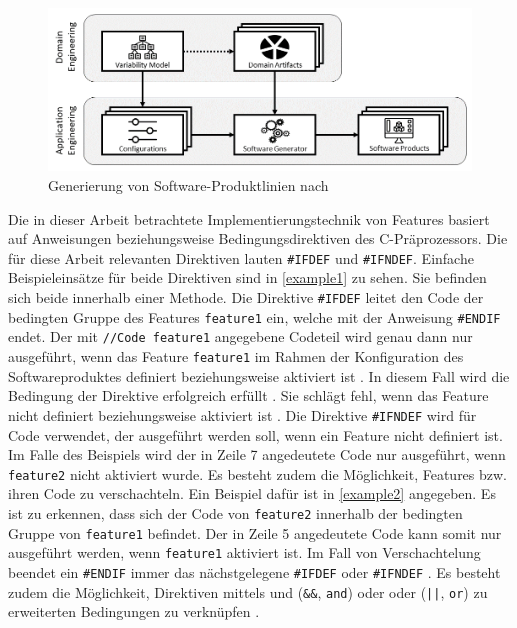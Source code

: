 \begin{figure}[]
    \centering
    \includegraphics[width=\textwidth]{images/SPL}
    \caption{Generierung von Software-Produktlinien nach \cite{Thuem2014}\label{fig:spl}}
\end{figure}

Die in dieser Arbeit betrachtete Implementierungstechnik von Features basiert auf Anweisungen beziehungsweise Bedingungsdirektiven des C-Präprozessors. Die für diese Arbeit relevanten Direktiven lauten \texttt{\#IFDEF} und \texttt{\#IFNDEF}. Einfache Beispieleinsätze für beide Direktiven sind in \autoref{example1} zu sehen. Sie befinden sich beide innerhalb einer Methode. Die Direktive \texttt{\#IFDEF} leitet den Code der bedingten Gruppe des Features \texttt{feature1} ein, welche mit der Anweisung \texttt{\#ENDIF} endet. Der mit \texttt{//Code feature1} angegebene Codeteil wird genau dann nur ausgeführt, wenn das Feature \texttt{feature1} im Rahmen der Konfiguration des Softwareproduktes definiert beziehungsweise aktiviert ist \cite{Stallmann2016}. In diesem Fall wird die Bedingung der Direktive erfolgreich erfüllt \cite{Stallmann2016}. Sie schlägt fehl, wenn das Feature nicht definiert beziehungsweise aktiviert ist \cite{Stallmann2016}. Die Direktive \texttt{\#IFNDEF} wird für Code verwendet, der ausgeführt werden soll, wenn ein Feature nicht definiert ist. Im Falle des Beispiels wird der in Zeile 7 angedeutete Code nur ausgeführt, wenn \texttt{feature2} nicht aktiviert wurde.
Es besteht zudem die Möglichkeit, Features bzw. ihren Code zu verschachteln. Ein Beispiel dafür ist in \autoref{example2} angegeben. Es ist zu erkennen, dass sich der Code von \texttt{feature2} innerhalb der bedingten Gruppe von \texttt{feature1} befindet. Der in Zeile 5 angedeutete Code kann somit nur ausgeführt werden, wenn \texttt{feature1} aktiviert ist. Im Fall von Verschachtelung beendet ein \texttt{\#ENDIF} immer das nächstgelegene \texttt{\#IFDEF} oder \texttt{\#IFNDEF} \cite{Stallmann2016}. Es besteht zudem die Möglichkeit, Direktiven mittels \glqq und\grqq{} (\texttt{\&\&}, \texttt{and}) oder \glqq oder\grqq{} (\texttt{||}, \texttt{or}) zu erweiterten Bedingungen zu verknüpfen \cite{Stallmann2016}.

